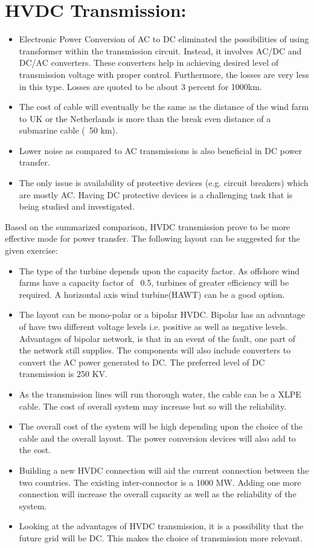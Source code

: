 \section{HVDC Transmission:}
\begin{itemize}
    \item Electronic Power Conversion of AC to DC eliminated the possibilities of using transformer within the transmission circuit. Instead, it involves AC/DC and DC/AC converters. These converters help in achieving  desired level of transmission voltage with proper control. Furthermore, the losses are very less in this type. Losses are quoted to be about 3 percent for  1000km. 
    \item The cost of cable will eventually be the same as the distance of the wind farm to UK or the Netherlands is more than the break even distance of a submarine cable (~50 km). 
    \item Lower noise as compared to AC transmissions is also beneficial in DC power transfer.
    \item The only issue is availability of protective devices (e.g. circuit breakers) which are mostly AC. Having DC protective devices is a challenging task that is being studied and investigated.
\end{itemize}
Based on the summarized comparison, HVDC transmission prove to be more effective mode for power transfer. 
The following layout can be suggested for the given exercise:
\begin{itemize}
    \item The type of the turbine depends upon the capacity factor. As offshore wind farms have a capacity factor of ~0.5, turbines of greater efficiency will be required. A horizontal axis wind turbine(HAWT) can be a good option. 
    \item The layout can be mono-polar or a bipolar HVDC. Bipolar has an advantage of have two different voltage levels i.e. positive as well as negative levels. Advantages of bipolar network, is that in an event of the fault, one part of the network still supplies. The components will also include converters to convert the AC power generated to DC. The preferred level of DC transmission is 250 KV.
    \item As the transmission lines will run thorough water, the cable can be a XLPE cable. The cost of overall system may increase but so will the reliability.
    \item The overall cost of the system will be high depending upon the choice of the cable and the overall layout. The power conversion devices will also add to the cost. 
    \item Building a new HVDC connection will aid the current connection between the two countries. The existing inter-connector is a 1000 MW. Adding one more connection will increase the overall capacity as well as the reliability of the system. 
    \item Looking at the advantages of HVDC transmission, it is a possibility that the future grid will be DC. This makes the choice of transmission more relevant. 
\end{itemize}
